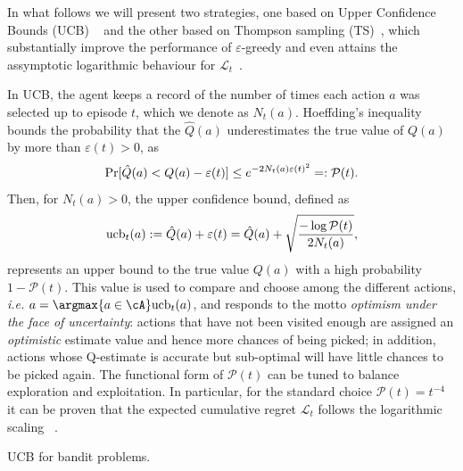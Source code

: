 In what follows we will present two strategies, one based on Upper Confidence Bounds (UCB) ~\cite{Lai1985,Agrawal1995,Auer2002} and the other based on Thompson sampling (TS)~\cite{Thompson1933,Thompson1935,Scott2010,Russo2018}, which substantially improve the performance of $\varepsilon$-greedy and even attains the assymptotic logarithmic behaviour for $\mathcal{L}_t$~\cite{TSoptimal}.%

In UCB, the agent keeps a record of the number of times each action $a$ was selected up to episode $t$, which we denote as $N_{t}(a)$. Hoeffding's inequality bounds the probability that the $\hat{Q}(a)$ underestimates the true value of ${Q}(a)$  by more than $\varepsilon(t)>0$, as
\begin{equation}\label{eq:ucbeq}\small
{\rm Pr}[ \hat{Q}(a)<Q(a)-{\varepsilon}(t) ] \leq e^{- 2 N_{t}(a) {\varepsilon}(t)^{2}} =: \mathcal{P}(t).
\end{equation}
Then, for  $N_{t}(a)>0$, the upper confidence bound, defined as
\begin{equation}
 \label{eq:ucbeq2}
{\rm ucb}_{t}(a):=\hat{Q}(a)+\varepsilon(t) = \hat{Q}(a)+\sqrt{\frac{-\log \mathcal{P}(t)}{2 N_{t}(a)}} ,
\end{equation}
represents an upper bound to the true value ${Q}(a)$ with a high probability $1-\mathcal{P}(t)$.
This value is used to compare and choose among the different actions, \textit{i.e.}
$a = \argmax{a \in \cA}\mathrm{ucb}_t(a)$, and responds to the motto \textit{optimism under the face of uncertainty}: actions that have not been visited enough are assigned an \textit{optimistic} estimate value and hence more chances of being picked; in addition, actions whose Q-estimate is accurate but sub-optimal will have little chances to be picked again. The functional form of $\mathcal{P}(t)$ can be tuned to balance exploration and exploitation. In particular, for the standard choice $\mathcal{P}(t) = t^{-4}$ it can be proven that the expected cumulative regret $\mathcal{L}_t$ follows the logarithmic scaling ~\cite{Auer2002, banditbook}.

\begin{algorithm}[h]\label{alg:ucbandit}
  \DontPrintSemicolon
  \SetAlgoNoEnd

\caption{UCB for bandit problems.}
\end{algorithm}

